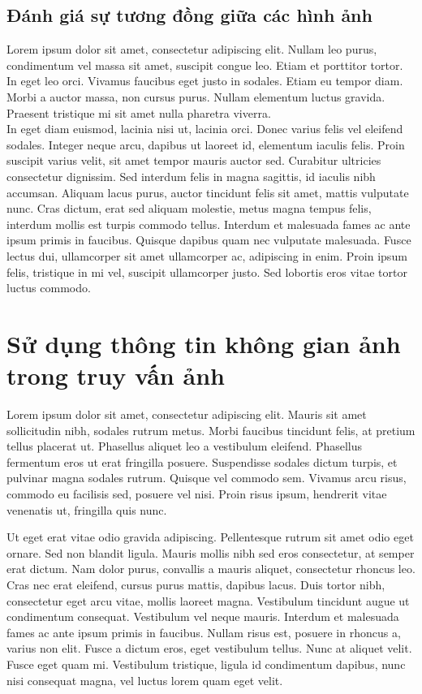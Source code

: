 \subsection{Đánh giá sự tương đồng giữa các hình ảnh}
Lorem ipsum dolor sit amet, consectetur adipiscing elit. Nullam leo purus, condimentum vel massa sit amet, suscipit congue leo. Etiam et porttitor tortor. In eget leo orci. Vivamus faucibus eget justo in sodales. Etiam eu tempor diam. Morbi a auctor massa, non cursus purus. Nullam elementum luctus gravida. Praesent tristique mi sit amet nulla pharetra viverra.\\

In eget diam euismod, lacinia nisi ut, lacinia orci. Donec varius felis vel eleifend sodales. Integer neque arcu, dapibus ut laoreet id, elementum iaculis felis. Proin suscipit varius velit, sit amet tempor mauris auctor sed. Curabitur ultricies consectetur dignissim. Sed interdum felis in magna sagittis, id iaculis nibh accumsan. Aliquam lacus purus, auctor tincidunt felis sit amet, mattis vulputate nunc. Cras dictum, erat sed aliquam molestie, metus magna tempus felis, interdum mollis est turpis commodo tellus. Interdum et malesuada fames ac ante ipsum primis in faucibus. Quisque dapibus quam nec vulputate malesuada. Fusce lectus dui, ullamcorper sit amet ullamcorper ac, adipiscing in enim. Proin ipsum felis, tristique in mi vel, suscipit ullamcorper justo. Sed lobortis eros vitae tortor luctus commodo.\\
\section{Sử dụng thông tin không gian ảnh trong truy vấn ảnh}
Lorem ipsum dolor sit amet, consectetur adipiscing elit. Mauris sit amet sollicitudin nibh, sodales rutrum metus. Morbi faucibus tincidunt felis, at pretium tellus placerat ut. Phasellus aliquet leo a vestibulum eleifend. Phasellus fermentum eros ut erat fringilla posuere. Suspendisse sodales dictum turpis, et pulvinar magna sodales rutrum. Quisque vel commodo sem. Vivamus arcu risus, commodo eu facilisis sed, posuere vel nisi. Proin risus ipsum, hendrerit vitae venenatis ut, fringilla quis nunc.

Ut eget erat vitae odio gravida adipiscing. Pellentesque rutrum sit amet odio eget ornare. Sed non blandit ligula. Mauris mollis nibh sed eros consectetur, at semper erat dictum. Nam dolor purus, convallis a mauris aliquet, consectetur rhoncus leo. Cras nec erat eleifend, cursus purus mattis, dapibus lacus. Duis tortor nibh, consectetur eget arcu vitae, mollis laoreet magna. Vestibulum tincidunt augue ut condimentum consequat. Vestibulum vel neque mauris. Interdum et malesuada fames ac ante ipsum primis in faucibus. Nullam risus est, posuere in rhoncus a, varius non elit. Fusce a dictum eros, eget vestibulum tellus. Nunc at aliquet velit. Fusce eget quam mi. Vestibulum tristique, ligula id condimentum dapibus, nunc nisi consequat magna, vel luctus lorem quam eget velit.

